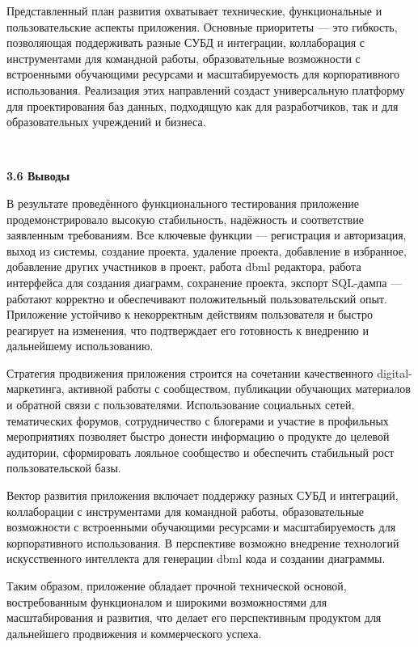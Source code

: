 Представленный план развития охватывает технические, функциональные и пользовательские аспекты приложения. Основные приоритеты — это гибкость, позволяющая поддерживать разные СУБД и интеграции, коллаборация с инструментами для командной работы, образовательные возможности с встроенными обучающими ресурсами и масштабируемость для корпоративного использования. Реализация этих направлений создаст универсальную платформу для проектирования баз данных, подходящую как для разработчиков, так и для образовательных учреждений и бизнеса.

\

\textbf{3.6 Выводы}

В результате проведённого функционального тестирования приложение
продемонстрировало высокую стабильность, надёжность и соответствие
заявленным требованиям. Все ключевые функции — регистрация
и авторизация, выход из системы, создание проекта, удаление проекта, добавление в избранное, добавление других участников в проект, работа dbml редактора, работа интерфейса для создания диаграмм, сохранение проекта, экспорт SQL-дампа — работают корректно и
обеспечивают положительный пользовательский опыт. Приложение
устойчиво к некорректным действиям пользователя и быстро реагирует на
изменения, что подтверждает его готовность к внедрению и дальнейшему использованию.

Стратегия продвижения приложения строится на сочетании
качественного digital-маркетинга, активной работы с сообществом,
публикации обучающих материалов и обратной связи с пользователями.
Использование социальных сетей, тематических форумов, сотрудничество с
блогерами и участие в профильных мероприятиях позволяет быстро донести
информацию о продукте до целевой аудитории, сформировать лояльное
сообщество и обеспечить стабильный рост пользовательской базы.

Вектор развития приложения включает поддержку разных СУБД и интеграций, коллаборации с инструментами для командной работы, образовательные возможности с встроенными обучающими ресурсами и масштабируемость для корпоративного использования. В перспективе возможно внедрение
технологий искусственного интеллекта для генерации dbml кода и создании диаграммы.

Таким образом, приложение обладает прочной технической основой,
востребованным функционалом и широкими возможностями для
масштабирования и развития, что делает его перспективным продуктом для
дальнейшего продвижения и коммерческого успеха.